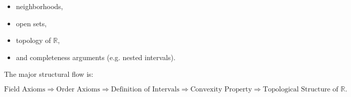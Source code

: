 \begin{itemize}
\item neighborhoods,
\item open sets,
\item topology of $\mathbb{R}$,
\item and completeness arguments (e.g. nested intervals).
\end{itemize}

\begin{remark*}
The major structural flow is:

\[
\text{Field Axioms}
\Rightarrow
\text{Order Axioms}
\Rightarrow
\text{Definition of Intervals}
\Rightarrow
\text{Convexity Property}
\Rightarrow
\text{Topological Structure of }\mathbb{R}.
\]
\end{remark*}
